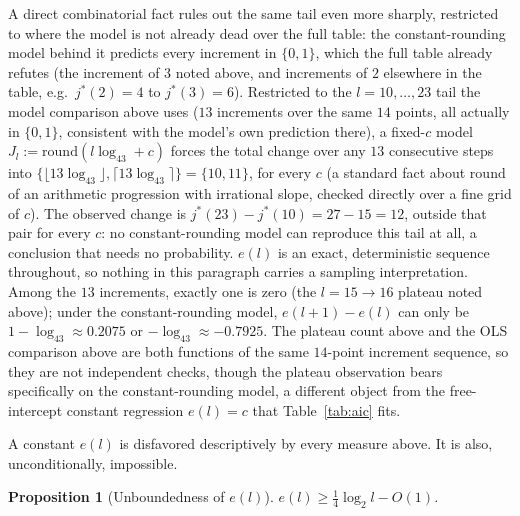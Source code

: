 \documentclass[11pt]{amsart}
\theoremstyle{plain}
\newtheorem{proposition}[theorem]{Proposition}
\theoremstyle{definition}
\theoremstyle{remark}
\begin{document}
A direct combinatorial fact rules out the same tail even more sharply, restricted to where the model
is not already dead over the full table: the constant-rounding model behind it predicts every
increment
in $\{0,1\}$, which the full table already refutes (the increment of $3$ noted above, and increments
of $2$ elsewhere in the table, e.g.\ $j^*(2)=4$ to $j^*(3)=6$).
Restricted to the $l=10,
\dots,23$ tail the model comparison above uses ($13$ increments over the same $14$ points, all
actually in $\{0,1\}$, consistent with the model's own prediction there), a fixed-$c$ model
$J_l:=\mathrm{round}(l\log_43+c)$ forces the total change over any $13$ consecutive steps into
$\{\lfloor13\log_43\rfloor,\lceil13\log_43\rceil\}=\{10,11\}$, for every $c$ (a standard fact about
$\mathrm{round}$ of an arithmetic progression with irrational slope, checked directly over a fine
grid of $c$). The observed change is $j^*(23)-j^*(10)=27-15=12$, outside that pair for every $c$: no
constant-rounding model can reproduce this tail at all, a conclusion that needs no probability. $e(l)$
is an exact, deterministic
sequence throughout, so nothing in this paragraph carries a sampling interpretation. Among the $13$
increments, exactly one is zero (the $l=15\to16$ plateau noted above); under the constant-rounding
model, $e(l+1)-e(l)$ can only be $1-\log_43\approx0.2075$ or $-\log_43\approx-0.7925$. The plateau
count above and the OLS comparison above are both functions of the same
$14$-point increment sequence, so they are not independent checks, though the plateau observation
bears
specifically on the constant-rounding model, a different object from the free-intercept constant
regression $e(l)=c$ that Table~\ref{tab:aic} fits.

A constant $e(l)$ is disfavored descriptively by every measure above. It is also, unconditionally,
impossible.

\begin{proposition}[Unboundedness of $e(l)$]
\label{prop:lowerbound}
$e(l) \ge \tfrac14\log_2 l - O(1)$.
\end{proposition}
\end{document}

